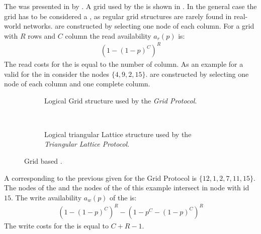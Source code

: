 \documentclass[conference]{IEEEtran}
\begin{document}
The  was presented in \cite{Kum90:pah} by \citeauthor{Kum90:pah}.
A grid used by the  is shown in .
In the general case the grid has to be considered a , as regular grid
structures are rarely found in real-world networks.
 are constructed by selecting one node of each column.
For a grid with \(R\) rows and \(C\) column the read availability \(a_r(p)\)
is:
\begin{align}
	(1 - (1 -p)^C)^R
\end{align}
The read costs for the  is equal to the number of column.
As an example for a valid  for the  in  consider the
nodes \(\{4,9,2,15\}\).
 are constructed by selecting one node of each column and one complete
column.
\begin{figure}
	\begin{subfigure}[t]{0.48\linewidth}
			
		\caption{Logical Grid structure used by the \emph{Grid Protocol}.}
		\label{fig:grid}
	\end{subfigure} ~
	\begin{subfigure}[t]{0.48\linewidth}
			
		\caption{Logical triangular Lattice structure used by the \emph{Triangular Lattice Protocol}.}
		\label{fig:lattice}
	\end{subfigure}
	\caption{Grid based .}
\end{figure}
A corresponding  to the previous given  for the Grid Protocol is
\(\{12,1,2,7,11,15\}\).
The nodes of the  and the nodes of the  of this example intersect
in node with id \(15\).
The write availability \(a_w(p)\) of the  is:
\begin{align}
	(1 - (1 - p)^C)^R - (1 - p^C - (1 - p)^C)^R
\end{align}
The write costs for the  is equal to \(C+R-1\).
\end{document}
